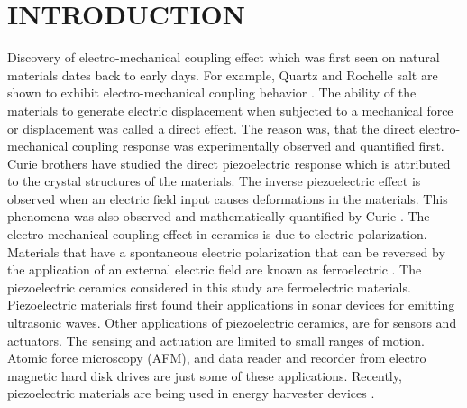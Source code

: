 %
%
%  

 

\pagestyle{plain} %
\setcounter{page}{1} 


\chapter{\uppercase {Introduction}}
Discovery of electro-mechanical coupling effect which was first seen on natural materials dates back to early days.
For example, Quartz and Rochelle salt are shown to exhibit electro-mechanical coupling behavior \cite{Lines1977}.
The ability of the materials to generate electric displacement when subjected to a mechanical force or displacement was called a direct effect.
The reason was, that the direct electro-mechanical coupling response was experimentally observed and quantified first.  
Curie brothers have studied the direct piezoelectric response \cite{Curie1882,Mould2007}
 which is attributed to the crystal structures of the materials.
The inverse piezoelectric effect is observed when an electric field input causes deformations in the materials.
This phenomena was also observed and mathematically quantified by Curie \cite{Curie1882,Mould2007}. 
The electro-mechanical coupling effect in ceramics is due to electric polarization.
Materials that have a spontaneous electric polarization that can be reversed by the application of an external electric field are known as ferroelectric \cite{Lines1977}.
The piezoelectric ceramics considered in this study are ferroelectric materials.
Piezoelectric materials first found their applications in sonar devices for emitting ultrasonic waves. 
Other applications of piezoelectric ceramics, are for sensors and actuators.
The sensing and actuation are limited to small ranges of motion.
Atomic force microscopy (AFM), and data reader and recorder from electro magnetic hard disk drives are just some of these applications. 
Recently, piezoelectric materials are being used in energy harvester devices \cite{erturk2011piezoelectric}. 


